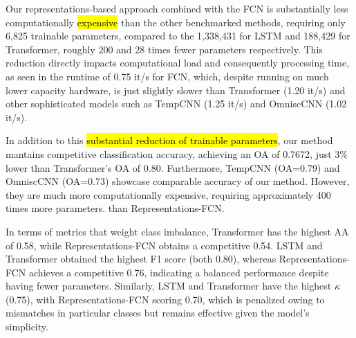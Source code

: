 \documentclass[journal,article,submit,pdftex,moreauthors]{Definitions/mdpi}
\begin{document}


Our representations-based approach combined with the FCN is substantially less computationally \hl{expensive} than the other benchmarked methods, requiring only 6,825 trainable parameters, compared to the 1,338,431 for LSTM and 188,429 for Transformer, roughly 200 and 28 times fewer parameters respectively. This reduction directly impacts computational load and consequently processing time, as seen in the runtime of 0.75 it/s for FCN, which, despite running on much lower capacity hardware, is just slightly slower than Transformer (1.20 it/s) and other sophisticated models such as TempCNN (1.25 it/s) and OmniscCNN (1.02 it/s).

In addition to this \hl{substantial reduction of trainable parameters}, our method mantains competitive classification accuracy, achieving an OA of 0.7672, just $3\%$ lower than Transformer's OA of 0.80. Furthermore, TempCNN (OA=0.79) and OmniscCNN (OA=0.73) showcase comparable accuracy of our method. However, they are much more computationally expensive, requiring approximately 400 times more parameters. than Representations-FCN.

In terms of metrics that weight class imbalance, Transformer has the highest AA of 0.58, while Representations-FCN obtains a competitive 0.54. LSTM and Transformer obtained the highest F1 score (both 0.80), whereas Representations-FCN achieves a competitive 0.76, indicating a balanced performance despite having fewer parameters. Similarly, LSTM and Transformer have the highest $\kappa$ (0.75), with Representations-FCN scoring 0.70, which is penalized owing to mismatches in particular classes but remains effective given the model's simplicity.
\end{document}
